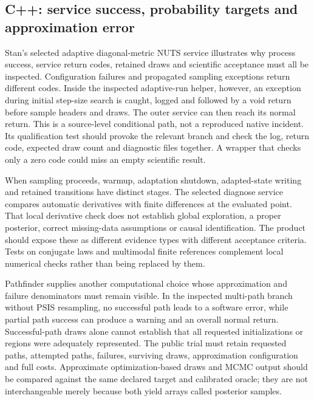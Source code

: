 \subsection{C++: service success, probability targets and approximation error}

Stan's selected adaptive diagonal-metric NUTS service illustrates why process success, service return codes, retained draws and scientific acceptance must all be inspected. Configuration failures and propagated sampling exceptions return different codes. Inside the inspected adaptive-run helper, however, an exception during initial step-size search is caught, logged and followed by a void return before sample headers and draws. The outer service can then reach its normal return. This is a source-level conditional path, not a reproduced native incident. Its qualification test should provoke the relevant branch and check the log, return code, expected draw count and diagnostic files together. A wrapper that checks only a zero code could miss an empty scientific result.~\citep{exec25_bsw_stan}

When sampling proceeds, warmup, adaptation shutdown, adapted-state writing and retained transitions have distinct stages. The selected diagnose service compares automatic derivatives with finite differences at the evaluated point. That local derivative check does not establish global exploration, a proper posterior, correct missing-data assumptions or causal identification. The product should expose these as different evidence types with different acceptance criteria. Tests on conjugate laws and multimodal finite references complement local numerical checks rather than being replaced by them.~\citep{exec25_bsw_stan,exec25_bsw_choice}

Pathfinder supplies another computational choice whose approximation and failure denominators must remain visible. In the inspected multi-path branch without PSIS resampling, no successful path leads to a software error, while partial path success can produce a warning and an overall normal return. Successful-path draws alone cannot establish that all requested initializations or regions were adequately represented. The public trial must retain requested paths, attempted paths, failures, surviving draws, approximation configuration and full costs. Approximate optimization-based draws and MCMC output should be compared against the same declared target and calibrated oracle; they are not interchangeable merely because both yield arrays called posterior samples.~\citep{exec25_bsw_stan,exec25_bsw_choice}

